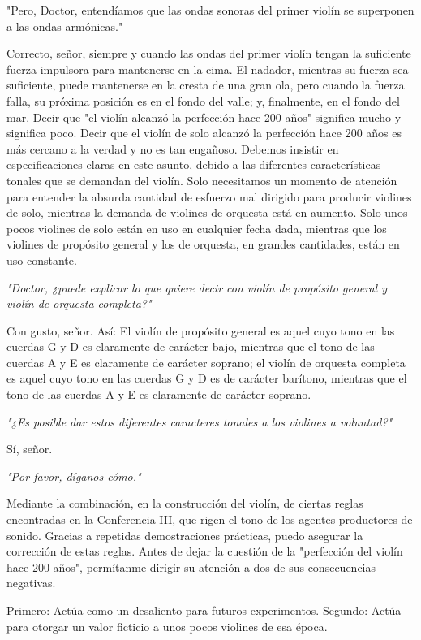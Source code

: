\documentclass[12pt]{book}
\begin{document}
"Pero, Doctor, entendíamos que las ondas sonoras del primer violín se superponen a las ondas armónicas."

Correcto, señor, siempre y cuando las ondas del primer violín tengan la suficiente fuerza impulsora para mantenerse en la cima. El nadador, mientras su fuerza sea suficiente, puede mantenerse en la cresta de una gran ola, pero cuando la fuerza falla, su próxima posición es en el fondo del valle; y, finalmente, en el fondo del mar.
Decir que "el violín alcanzó la perfección hace 200 años" significa mucho y significa poco. Decir que el violín de solo alcanzó la perfección hace 200 años es más cercano a la verdad y no es tan engañoso. Debemos insistir en especificaciones claras en este asunto, debido a las diferentes características tonales que se demandan del violín. Solo necesitamos un momento de atención para entender la absurda cantidad de esfuerzo mal dirigido para producir violines de solo, mientras la demanda de violines de orquesta está en aumento.
Solo unos pocos violines de solo están en uso en cualquier fecha dada, mientras que los violines de propósito general y los de orquesta, en grandes cantidades, están en uso constante.

\textit{"Doctor, ¿puede explicar lo que quiere decir con violín de propósito general y violín de orquesta completa?"}

Con gusto, señor.
Así: El violín de propósito general es aquel cuyo tono en las cuerdas G y D es claramente de carácter bajo, mientras que el tono de las cuerdas A y E es claramente de carácter soprano; el violín de orquesta completa es aquel cuyo tono en las cuerdas G y D es de carácter barítono, mientras que el tono de las cuerdas A y E es claramente de carácter soprano.

\textit{"¿Es posible dar estos diferentes caracteres tonales a los violines a voluntad?"}

Sí, señor.

\textit{"Por favor, díganos cómo."}

Mediante la combinación, en la construcción del violín, de ciertas reglas encontradas en la Conferencia III, que rigen el tono de los agentes productores de sonido.
Gracias a repetidas demostraciones prácticas, puedo asegurar la corrección de estas reglas. Antes de dejar la cuestión de la "perfección del violín hace 200 años", permítanme dirigir su atención a dos de sus consecuencias negativas.

Primero: Actúa como un desaliento para futuros experimentos.
Segundo: Actúa para otorgar un valor ficticio a unos pocos violines de esa época. 
\end{document}
